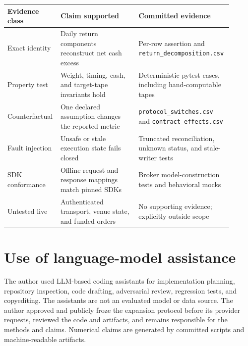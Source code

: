 \documentclass{article}
\begin{document}
\begin{center}
\small
\begin{tabular}{>{\raggedright\arraybackslash}p{0.20\linewidth}
                >{\raggedright\arraybackslash}p{0.34\linewidth}
                >{\raggedright\arraybackslash}p{0.36\linewidth}}
  \toprule
  Evidence class & Claim supported & Committed evidence \\
  \midrule
  Exact identity & Daily return components reconstruct net cash excess & Per-row assertion and \texttt{return\_decomposition.csv} \\
  Property test & Weight, timing, cash, and target-tape invariants hold & Deterministic pytest cases, including hand-computable tapes \\
  Counterfactual & One declared assumption changes the reported metric & \texttt{protocol\_switches.csv} and \texttt{contract\_effects.csv} \\
  Fault injection & Unsafe or stale execution state fails closed & Truncated reconciliation, unknown status, and stale-writer tests \\
  SDK conformance & Offline request and response mappings match pinned SDKs & Broker model-construction tests and behavioral mocks \\
  Untested live & Authenticated transport, venue state, and funded orders & No supporting evidence; explicitly outside scope \\
  \bottomrule
\end{tabular}
\end{center}

\section{Use of language-model assistance}

The author used LLM-based coding assistants for implementation planning,
repository inspection, code drafting, adversarial review, regression tests, and
copyediting. The assistants are not an evaluated model or data source. The
author approved and publicly froze the expansion protocol before its provider
requests, reviewed the code and artifacts, and remains responsible for the
methods and claims. Numerical claims are generated by committed scripts and
machine-readable artifacts.


\end{document}

